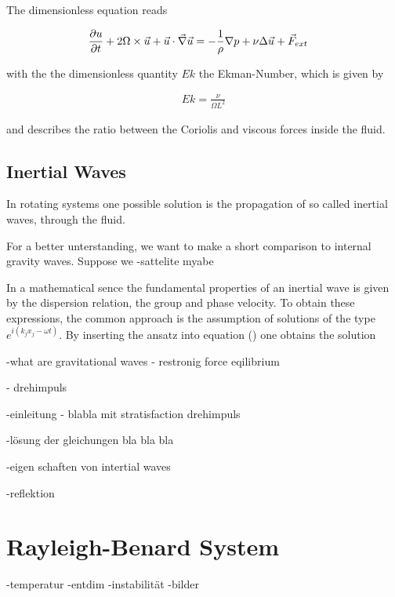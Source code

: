 The dimensionless equation reads

\begin{align}
    \pdn[u]{t} + 2\Omega \times \vec{u} +  \vec{u} \cdot \vec{\nabla} \vec{u} &= - \frac{1}{\rho} \nabla p + \nu \Delta \vec{u} + \vec{F}_{ext}
\end{align}

with the the dimensionless quantity $Ek$ the Ekman-Number, which is given by

\begin{align}
    Ek = \frac{\nu}{\Omega L^2}
\end{align}

and describes the ratio between the Coriolis and viscous forces inside the fluid.

\subsection{Inertial Waves}

In rotating systems one possible solution is the propagation of so called inertial waves, through the fluid.

For a better unterstanding, we want to make a short comparison to internal gravity waves.
Suppose we
-sattelite myabe

In a mathematical sence the fundamental properties of an inertial wave is given by the dispersion relation, the group and phase velocity.
To obtain these expressions, the common approach is the assumption of solutions of the type $e^{i(k_j x_j - \omega t)}$.
By inserting the ansatz into equation () one obtains the solution




-what are gravitational waves
- restronig force eqilibrium

- drehimpuls





-einleitung - blabla mit stratisfaction drehimpuls

-lösung der gleichungen  bla bla bla

-eigen schaften von intertial waves

-reflektion

\section{Rayleigh-Benard System}
-temperatur
-entdim
-instabilität
-bilder






